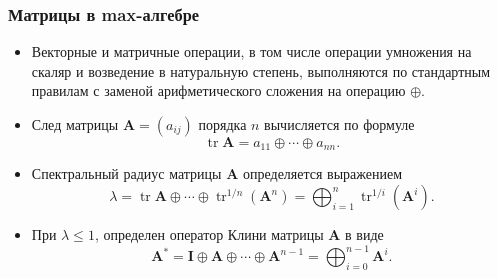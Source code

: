 \documentclass[ucs, notheorems, handout]{beamer}
\begin{document}
\begin{frame}
    \frametitle{Матрицы в max-алгебре}
    \begin{itemize}
        \item Векторные и матричные операции, в том числе операции умножения на скаляр и возведение в натуральную степень, выполняются по стандартным правилам с заменой арифметического сложения на операцию $\oplus$. 
        
        
        
        
        \item След матрицы $\bm{A}=(a_{ij})$ порядка $n$ вычисляется по формуле
        $$\mathop\mathrm{tr}\bm{A}=a_{11}\oplus\cdots\oplus a_{nn}.$$

        \item Спектральный радиус матрицы $\bm{A}$ определяется выражением
        \begin{equation*}
        \lambda
        =
        \mathop\mathrm{tr}\bm{A}\oplus\cdots\oplus\mathop\mathrm{tr}\nolimits^{1/n}(\bm{A}^{n})
        =
        \bigoplus_{i=1}^{n}{\mathop\mathrm{tr}}^{1/i}(\bm{A}^{i}).
        \end{equation*}

        \item При $\lambda\leq1$, определен оператор Клини матрицы $\bm{A}$ в виде
        \begin{equation*}
        \bm{A}^{\ast}
        =
        \bm{I}\oplus\bm{A}\oplus\cdots\oplus\bm{A}^{n-1}
        =
        \bigoplus_{i=0}^{n-1}\bm{A}^{i}.
        \end{equation*}
    \end{itemize}

\end{frame}
\end{document}
